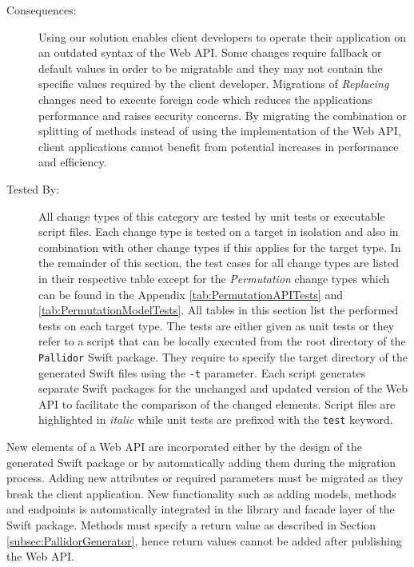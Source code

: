 \begin{description}
\item[Consequences:] Using our solution enables client developers to operate their application on an outdated syntax of the Web API. Some changes require fallback or default values in order to be migratable and they may not contain the specific values required by the client developer. Migrations of \textit{Replacing} changes need to execute foreign code which reduces the applications performance and raises security concerns. By migrating the combination or splitting of methods instead of using the implementation of the Web API, client applications cannot benefit from potential increases in performance and efficiency.
\item[Tested By:] All change types of this category are tested by unit tests or executable script files. Each change type is tested on a target in isolation and also in combination with other change types if this applies for the target type. In the remainder of this section, the test cases for all change types are listed in their respective table except for the \textit{Permutation} change types which can be found in the Appendix \ref{tab:PermutationAPITests} and \ref{tab:PermutationModelTests}. All tables in this section list the performed tests on each target type. The tests are either given as unit tests or they refer to a script that can be locally executed from the root directory of the \texttt{Pallidor} Swift package. They require to specify the target directory of the generated Swift files using the \texttt{-t} parameter. Each script generates separate Swift packages for the unchanged and updated version of the Web API to facilitate the comparison of the changed elements. Script files are highlighted in \textit{italic} while unit tests are prefixed with the \texttt{test} keyword.
\end{description}

New elements of a Web API are incorporated either by the design of the generated Swift package or by automatically adding them during the migration process. Adding new attributes or required parameters must be migrated as they break the client application. New functionality such as adding models, methods and endpoints is automatically integrated in the library and facade layer of the Swift package. Methods must specify a return value as described in Section \ref{subsec:PallidorGenerator}, hence return values cannot be added after publishing the Web API.

